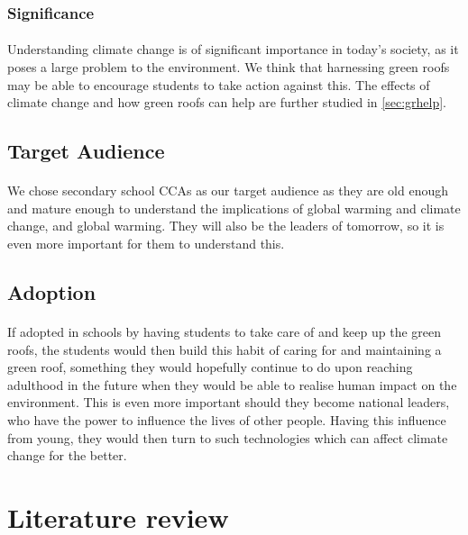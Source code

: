 \documentclass{article}
\begin{document}
\begin{multicols}{2}
  \subsubsection{Significance}
  \paragraph{} Understanding climate change is of significant importance
  in today's society, as it poses a large problem to the environment.
  We think that harnessing green roofs may be able to encourage students
  to take action against this. The effects of climate change and how green
  roofs can help are further studied in \cref{sec:grhelp}.

  \subsection{Target Audience}
  \paragraph{} We chose secondary school CCAs as our target audience as
  they are old enough and mature enough to understand the implications
  of global warming and climate change, and global warming. They will
  also be the leaders of tomorrow, so it is even more important for them
  to understand this.


  \subsection{Adoption}
  \paragraph{} If adopted in schools by having students to take care
  of and keep up the green roofs, the students would then build this
  habit of caring for and maintaining a green roof, something they would
  hopefully continue to do upon reaching adulthood in the future when
  they would be able to realise human impact on the environment. This is
  even more important should they become national leaders, who have the
  power to influence the lives of other people. Having this influence
  from young, they would then turn to such technologies which can affect
  climate change for the better.

  \section{Literature review}

\end{multicols}
\end{document}
